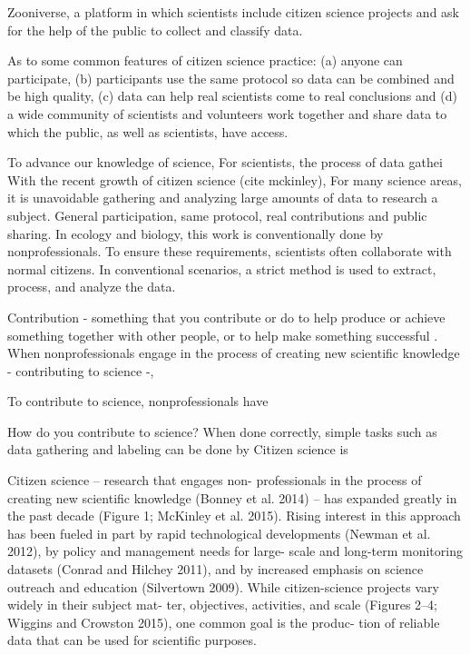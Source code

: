 Zooniverse, a platform in which scientists include  citizen science projects and ask for the help of the public to collect and classify data.

As to some common features of citizen science practice: (a) anyone can participate, (b) participants use the same protocol so data can be combined and be high quality, (c) data can help real scientists come to real conclusions and (d) a wide community of scientists and volunteers work together and share data to which the public, as well as scientists, have access. 

To advance our knowledge of science, 
For scientists, the process of data gathei
With the recent growth of citizen science (cite mckinley), 
For many science areas, it is unavoidable gathering and analyzing large amounts of data to research a subject. 
General participation, same protocol, real contributions and public sharing.
In ecology and biology, this work is conventionally done by nonprofessionals.
To ensure these requirements, scientists often collaborate with normal citizens.
In conventional scenarios, a strict method is used to extract, process, and analyze the data.

Contribution - something that you contribute or do to help produce or achieve something together with other people, or to help make something successful \cite{TCDP2020}. 
When nonprofessionals engage in the process of creating new scientific knowledge - contributing to science -, 

To contribute to science, nonprofessionals have 

How do you contribute to science?
When done correctly, simple tasks such as data gathering and labeling can be done by
Citizen science is 


Citizen science – research that engages non- professionals in the process of creating new scientific knowledge (Bonney et al. 2014) – has expanded greatly in the past decade (Figure 1; McKinley et al. 2015). Rising interest in this approach has been fueled in part by rapid technological developments (Newman et al. 2012), by policy and management needs for large- scale and long-term monitoring datasets (Conrad and Hilchey 2011), and by increased emphasis on science outreach and education (Silvertown 2009). While citizen-science projects vary widely in their subject mat- ter, objectives, activities, and scale (Figures 2–4; Wiggins and Crowston 2015), one common goal is the produc- tion of reliable data that can be used for scientific purposes.

